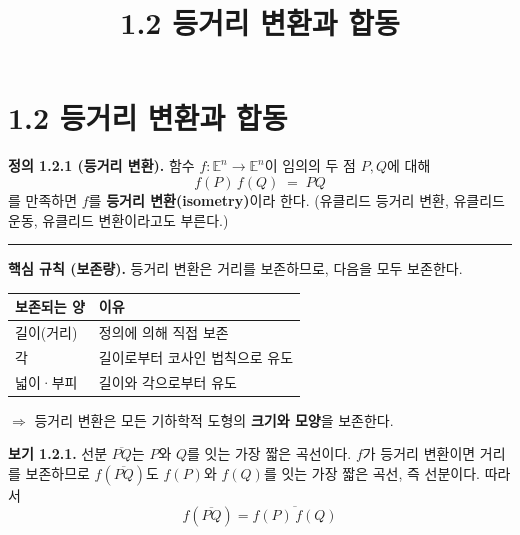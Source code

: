 \documentclass{article}
\title{1.2 등거리 변환과 합동}
\date{}
\author{}
\begin{document}
\maketitle

\section*{1.2 등거리 변환과 합동}

\begin{tcolorbox}[
  colback=teal!4, colframe=teal!65!black,
  title=정의 \& 핵심 규칙,
  fonttitle=\bfseries, boxrule=0.5mm, arc=3mm]

\textbf{\textcolor{teal!65!black}{정의 1.2.1 (등거리 변환).}}\quad
함수 $f : \mathbb{E}^n \to \mathbb{E}^n$이 임의의 두 점 $P, Q$에 대해
\[
  f(P)\,f(Q) \;=\; PQ
\]
를 만족하면 $f$를 \textbf{등거리 변환(isometry)}이라 한다.
(유클리드 등거리 변환, 유클리드 운동, 유클리드 변환이라고도 부른다.)

\noindent\textcolor{teal!50!black}{\rule{\linewidth}{0.4pt}}

\textbf{\textcolor{teal!65!black}{핵심 규칙 (보존량).}}\quad
등거리 변환은 거리를 보존하므로, 다음을 모두 보존한다.

\smallskip
\begin{center}
\renewcommand{\arraystretch}{1.25}
\begin{tabular}{|l|l|}
\hline
보존되는 양 & 이유 \\
\hline
길이(거리) & 정의에 의해 직접 보존 \\
각 & 길이로부터 코사인 법칙으로 유도 \\
넓이·부피 & 길이와 각으로부터 유도 \\
\hline
\end{tabular}
\end{center}

\smallskip
$\Rightarrow$ 등거리 변환은 모든 기하학적 도형의 \textbf{크기와 모양}을 보존한다.

\end{tcolorbox}

\medskip
\textbf{보기 1.2.1.}\quad
선분 $\overline{PQ}$는 $P$와 $Q$를 잇는 가장 짧은 곡선이다.
$f$가 등거리 변환이면 거리를 보존하므로 $f(\overline{PQ})$도 $f(P)$와 $f(Q)$를 잇는
가장 짧은 곡선, 즉 선분이다. 따라서
\[
  f\!\left(\overline{PQ}\right) = \overline{f(P)\,f(Q)}
\]
\end{document}
